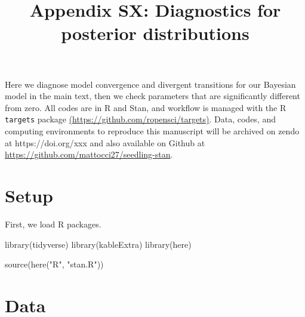 \documentclass[
  11pt,
  letterpaper,
  DIV=11,
  numbers=noendperiod]{scrartcl}
\title{Appendix SX: Diagnostics for posterior distributions}
\author{}
\date{}
\newenvironment{Shaded}{}{}
\newcommand{\FunctionTok}[1]{\textcolor[rgb]{0.44,0.26,0.76}{#1}}
\newcommand{\NormalTok}[1]{\textcolor[rgb]{0.14,0.16,0.18}{#1}}
\newcommand{\StringTok}[1]{\textcolor[rgb]{0.01,0.18,0.38}{#1}}
\renewcommand*\contentsname{Table of contents}
\newcommand\contentsname{Table of contents}
\begin{document}
\maketitle
\ifdefined\Shaded\renewenvironment{Shaded}{\begin{tcolorbox}[interior hidden, sharp corners, breakable, boxrule=0pt, enhanced, frame hidden, borderline west={3pt}{0pt}{shadecolor}]}{\end{tcolorbox}}\fi

\renewcommand*\contentsname{Table of contents}
{
\hypersetup{linkcolor=}
\setcounter{tocdepth}{3}
\tableofcontents
}
\newpage

Here we diagnose model convergence and divergent transitions for our
Bayesian model in the main text, then we check parameters that are
significantly different from zero. All codes are in R and Stan, and
workflow is managed with the R \texttt{targets} package
\href{https://github.com/ropensci/targets}{(https://github.com/ropensci/targets)}.
Data, codes, and computing environments to reproduce this manuscript
will be archived on zendo at https://doi.org/xxx and also available on
Github at \url{https://github.com/mattocci27/seedling-stan}.

\hypertarget{setup}{%
\section{Setup}\label{setup}}

First, we load R packages.

\begin{Shaded}
\begin{Highlighting}[]
\FunctionTok{library}\NormalTok{(tidyverse)}
\FunctionTok{library}\NormalTok{(kableExtra)}
\FunctionTok{library}\NormalTok{(here)}
\end{Highlighting}
\end{Shaded}

\begin{Shaded}
\begin{Highlighting}[]
\FunctionTok{source}\NormalTok{(}\FunctionTok{here}\NormalTok{(}\StringTok{"R"}\NormalTok{, }\StringTok{"stan.R"}\NormalTok{))}
\end{Highlighting}
\end{Shaded}

\hypertarget{data}{%
\section{Data}\label{data}}
\end{document}
